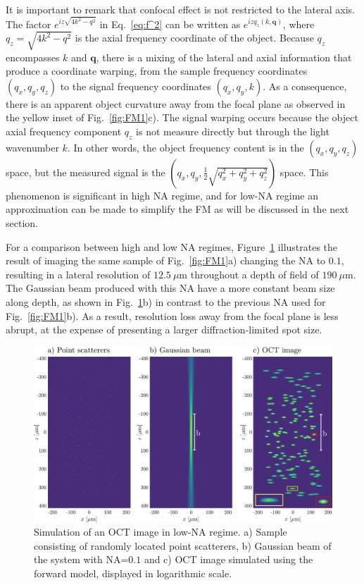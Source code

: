 It is important to remark that confocal effect is not restricted to the lateral axis. The factor $e^{iz\sqrt{4k^2-q^2}}$ in Eq.~\eqref{eq:f^2} can be written as $e^{izq_z(k, \mathbf{q})}$, where $q_z=\sqrt{4k^2-q^2}$ is the axial frequency coordinate of the object. Because $q_z$ encompasses $k$ and $\mathbf{q}$, there is a mixing of the lateral and axial information that produce a coordinate warping, from the sample frequency coordinates $(q_x, q_y, q_z)$ to the signal frequency coordinates $(q_x, q_y, k)$. As a consequence, there is an apparent object curvature away from the focal plane as observed in the yellow inset of Fig.~\ref{fig:FM1}c). The signal warping occurs because the object axial frequency component $q_z$ is not measure directly but through the light wavenumber $k$. In other words, the object frequency content is in the $(q_x, q_y, q_z)$ space, but the measured signal is the $(q_x, q_y, \frac{1}{2}\sqrt{q_x^2 + q_y^2 + q_z^2})$ space. This phenomenon is significant in high NA regime, and for low-NA regime an approximation can be made to simplify the FM as will be discussed in the next section.

For a comparison between high and low NA regimes, Figure~\ref{fig:FM2} illustrates the result of imaging the same sample of Fig.~\ref{fig:FM1}a) changing the NA to $0.1$, resulting in a lateral resolution of $ 12.5~\mu$m throughout a depth of field of $190~\mu$m. The Gaussian beam produced with this NA have a more constant beam size along depth, as shown in Fig.~\ref{fig:FM2}b) in contrast to the previous NA used for Fig.~\ref{fig:FM1}b). As a result, resolution loss away from the focal plane is less abrupt, at the expense of presenting a larger diffraction-limited spot size.

\begin{figure}[htb!]
    \centering
    \includegraphics[width=\textwidth]{Figures/TheoreticalBasis/FM2.pdf}
    \caption{Simulation of an OCT image in low-NA regime. a) Sample consisting of randomly located point scatterers, b) Gaussian beam of the system with NA=$0.1$ and c) OCT image simulated using the forward model, displayed in logarithmic scale.}
    \label{fig:FM2}
\end{figure}


